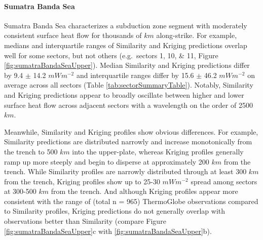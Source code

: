 \hypertarget{sumatra-banda-sea}{%
\paragraph{Sumatra Banda Sea}\label{sumatra-banda-sea}}

Sumatra Banda Sea characterizes a subduction zone segment with moderately consistent surface heat flow for thousands of \(km\) along-strike. For example, medians and interquartile ranges of Similarity and Kriging predictions overlap well for some sectors, but not others (e.g.~sectors 1, 10, \& 11, Figure \ref{fig:sumatraBandaSeaUpper}). Median Similarity and Kriging predictions differ by 9.4 \(\pm\) 14.2 \(mWm^{-2}\) and interquartile ranges differ by 15.6 \(\pm\) 46.2 \(mWm^{-2}\) on average across all sectors (Table \ref{tab:sectorSummaryTable}). Notably, Similarity and Kriging predictions appear to broadly oscillate between higher and lower surface heat flow across adjacent sectors with a wavelength on the order of 2500 \(km\).

Meanwhile, Similarity and Kriging profiles show obvious differences. For example, Similarity predictions are distributed narrowly and increase monotonically from the trench to 500 \(km\) into the upper-plate, whereas Kriging profiles generally ramp up more steeply and begin to disperse at approximately 200 \(km\) from the trench. While Similarity profiles are narrowly distributed through at least 300 \(km\) from the trench, Kriging profiles show up to 25-30 \(mWm^{-2}\) spread among sectors at 300-500 \(km\) from the trench. And although Kriging profiles appear more consistent with the range of (total n = 965) ThermoGlobe observations compared to Similarity profiles, Kriging predictions do not generally overlap with observations better than Similarity (compare Figure \ref{fig:sumatraBandaSeaUpper}c with \ref{fig:sumatraBandaSeaUpper}b).



